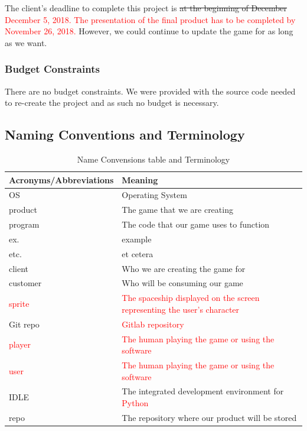 \documentclass[12pt, titlepage]{article}
\begin{document}
The client's deadline to complete this project is \sout{at the beginning of December} \textcolor{red}{December 5, 2018. The presentation of the final product has to be completed by November 26, 2018.} However, we could continue to update the game for as long as we want.

\subsubsection{Budget Constraints}

There are no budget constraints. We were provided with the source code needed to re-create the project and as such no budget is necessary.

\newpage

\subsection{Naming Conventions and Terminology}

\begin{table}[H]
\caption{Name Convensions table and Terminology}
\begin{tabular}{ |p{5cm}|p{8cm}|}
\hline
 Acronyms/Abbreviations &  Meaning \\ \hline
 OS &  Operating System  \\ \hline
 product & The game that we are creating   \\ \hline
 program & The code that our game uses to function   \\ \hline
 ex. & example \\ \hline
 etc. & et cetera \\ \hline
 client & Who we are creating the game for \\ \hline
 customer & Who will be consuming our game \\ \hline
\textcolor{red}{sprite} & \textcolor{red}{The spaceship displayed on the screen representing the user's character}  \\ \hline
 Git repo& \textcolor{red}{Gitlab repository} \\ \hline
\textcolor{red}{player} & \textcolor{red}{The human playing the game or using the software}\\ \hline
\textcolor{red}{user} & \textcolor{red}{The human playing the game or using the software}\\ \hline
 IDLE & The integrated development environment for \textcolor{red}{Python} \\ \hline
 repo & The repository where our product will be stored \\ \hline
\end{tabular}
\end{table}
\end{document}

